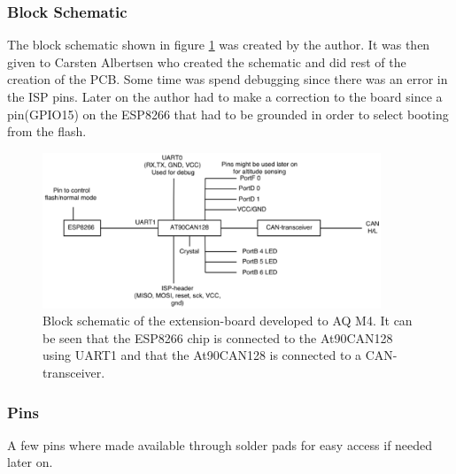\subsubsection*{Block Schematic}
The block schematic shown in figure \ref{fig:PCB_block} was created by the author. It was then given to Carsten Albertsen who created the schematic and did rest of the creation of the PCB. Some time was spend  debugging since there was an error in the ISP pins. Later on the author had to make a correction to the board since a pin(GPIO15) on the ESP8266 that had to be grounded in order to select booting from the flash.
\begin{figure}[H]
    \center
    \includegraphics[width=0.9\textwidth]{graphics/PCB_block_v3.eps}
    \caption{Block schematic of the extension-board developed to AQ M4. It can be seen that the ESP8266 chip is connected to the At90CAN128 using UART1 and that the At90CAN128 is connected to a CAN-transceiver.}
    \label{fig:PCB_block}
\end{figure}

\subsubsection*{Pins}
A few pins where made available through solder pads for easy access if needed later on.

